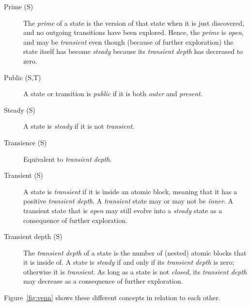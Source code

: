 \documentclass{article}
\begin{document}
\begin{description}
\item[Prime (S)] The \emph{prime} of a state is the version of that state when it is just discovered, and no outgoing transitions have been explored. Hence, the \emph{prime} is \emph{open}, and may be \emph{transient} even though (because of further exploration) the state itself has become \emph{steady} because its \emph{transient depth} has decreased to zero.

\item[Public (S,T)] A state or transition is \emph{public} if it is both \emph{outer} and \emph{present}.

\item[Steady (S)] A state is \emph{steady} if it is not \emph{transient}.

\item[Transience (S)] Equivalent to \emph{transient depth}.

\item[Transient (S)] A state is \emph{transient} if it is inside an atomic block, meaning that it has a positive \emph{transient depth}. A \emph{transient} state may or may not be \emph{inner}. A transient state that is \emph{open} may still evolve into a \emph{steady} state as a consequence of further exploration.

\item[Transient depth (S)] The \emph{transient depth} of a state is the number of (nested) atomic blocks that it is inside of. A state is \emph{steady} if and only if its \emph{transient depth} is zero; otherwise it is \emph{transient}. As long as a state is not \emph{closed}, its \emph{transient depth} may decrease as a consequence of further exploration.
\end{description}

Figure~\ref{fig:venn} shows these different concepts in relation to each other.
\end{document}

